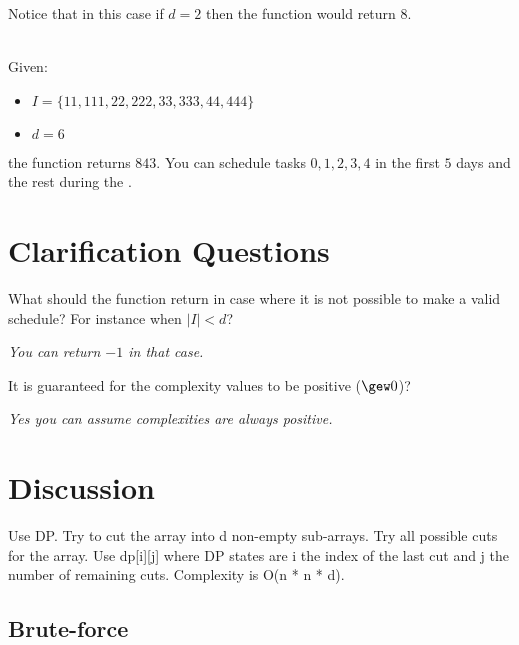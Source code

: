 \begin{exercise}
\begin{example}
		Notice that in this case if $d = 2$ then the function would return $8$.
	\end{example}

	\begin{example}
		\hfill \\
		Given:
		\begin{itemize}
			\item $I = \{11,111,22,222,33,333,44,444\}$
			\item $d = 6$
		\end{itemize}
		the function returns $843$. You can schedule tasks $0,1,2,3,4$ in the first $5$ days and the
		rest during the .
		
	\end{example}
\end{exercise}





	\section{Clarification Questions}
	
	\begin{QandA}
		\item What should the function return in case where it is not possible to make a valid
		schedule? For instance when $|I| < d$?
	\begin{answered}
		\textit{You can return $-1$ in that case.}
	\end{answered}

	\item It is guaranteed for the complexity values to be positive ($\gew 0$)?
	\begin{answered}
		\textit{Yes you can assume complexities are always positive.}
	\end{answered}

	
	
\end{QandA}

\section{Discussion}
\label{min_difficulty_job_scheduler:sec:discussion}
Use DP. Try to cut the array into d non-empty sub-arrays. Try all possible cuts for the array.
Use dp[i][j] where DP states are i the index of the last cut and j the number of remaining cuts. Complexity is O(n * n * d).

\subsection{Brute-force}
\label{min_difficulty_job_scheduler:sec:bruteforce}



